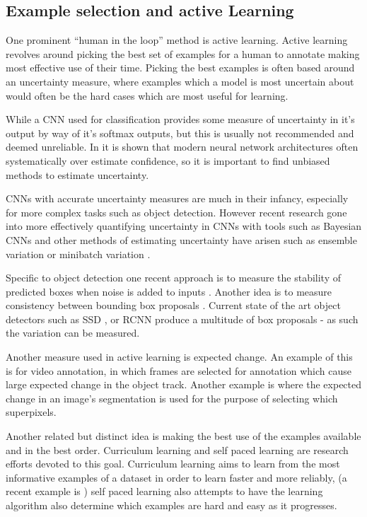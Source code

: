 \subsection{Example selection and active Learning} 

One prominent ``human in the loop'' method is active learning. Active learning revolves around picking the best set of examples for a human to annotate making most effective use of their time. Picking the best examples is often based around an uncertainty measure, where examples which a model is most uncertain about would often be the hard cases which are most useful for learning. 
 
While a \gls{CNN} used for classification provides some measure of uncertainty in it's output by way of it's softmax outputs, but this is usually not recommended and deemed unreliable. In \cite{Guo2017} it is shown that modern neural network architectures often systematically over estimate confidence, so it is important to find unbiased methods to estimate uncertainty.

\gls{CNN}s with accurate uncertainty measures are much in their infancy, especially for more complex tasks such as object detection. However recent research gone into more effectively quantifying uncertainty in \gls{CNN}s with tools such as Bayesian \gls{CNN}s \cite{Gal2017} and other methods of estimating uncertainty have arisen such as ensemble variation \cite{Beluch2018} or minibatch variation \cite{Chang2017}. 

Specific to object detection one recent approach is to measure the stability of predicted boxes when noise is added to inputs \cite{Kao2018}. Another idea is to measure consistency between bounding box proposals \cite{Kao2018, Brust2018, Le2018}. Current state of the art object detectors such as \gls{SSD} \cite{Liu2016a}, or \gls{RCNN} \cite{Wang2017} produce a multitude of box proposals - as such the variation can be measured.

Another measure used in active learning is expected change. An example of this is \cite{Vondrick2011} for video annotation, in which frames are selected for annotation which cause large expected change in the object track. Another example is \cite{Xu2017} where the expected change in an image's segmentation is used for the purpose of selecting which superpixels. 

Another related but distinct idea is making the best use of the examples available and in the best order. Curriculum learning and self paced learning \cite{Kumar2010} are research efforts devoted to this goal. Curriculum learning aims to learn from the most informative examples of a dataset in order to learn faster and more reliably, (a recent example is \cite{Katharopoulos2018}) self paced learning also attempts to have the learning algorithm also determine which examples are hard and easy as it progresses.


